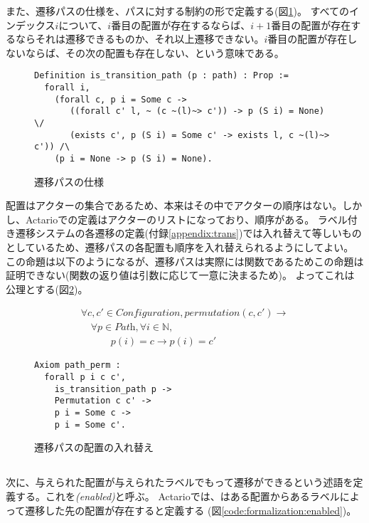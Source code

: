 また、遷移パスの仕様を、パスに対する制約の形で定義する(図\ref{code:formalization:path-spec})。
すべてのインデックス$i$について、$i$番目の配置が存在するならば、$i+1$番目の配置が存在するならそれは遷移できるものか、それ以上遷移できない。$i$番目の配置が存在しないならば、その次の配置も存在しない、という意味である。

\begin{figure}[tp]
\begin{lstlisting}
Definition is_transition_path (p : path) : Prop :=
  forall i,
    (forall c, p i = Some c ->
       ((forall c' l, ~ (c ~(l)~> c')) -> p (S i) = None) \/
       (exists c', p (S i) = Some c' -> exists l, c ~(l)~> c')) /\
    (p i = None -> p (S i) = None).
\end{lstlisting}
  \label{code:formalization:path-spec}
  \caption{遷移パスの仕様}
\end{figure}

配置はアクターの集合であるため、本来はその中でアクターの順序はない。しかし、Actarioでの定義はアクターのリストになっており、順序がある。
ラベル付き遷移システムの各遷移の定義(付録\ref{appendix:trans})では入れ替えて等しいものとしているため、遷移パスの各配置も順序を入れ替えられるようにしてよい。
この命題は以下のようになるが、遷移パスは実際には関数であるためこの命題は証明できない(関数の返り値は引数に応じて一意に決まるため)。
よってこれは公理とする(図\ref{code:proof:path-perm})。

\begin{displaymath}
  \begin{array}{l}
    \forall c, c' \in \textit{Configuration}, permutation(c, c') \rightarrow \\
    \quad \forall p \in \textit{Path}, \forall i \in \mathbb{N}, \\
    \quad \quad \quad p(i) = c \rightarrow p(i) = c'
  \end{array}
\end{displaymath}

\begin{figure}[tp]
\begin{lstlisting}
Axiom path_perm :
  forall p i c c',
    is_transition_path p ->
    Permutation c c' ->
    p i = Some c ->
    p i = Some c'.
\end{lstlisting}
  \label{code:proof:path-perm}
  \caption{遷移パスの配置の入れ替え}
\end{figure}

\subsection{\enabled}
次に、与えられた配置が与えられたラベルでもって遷移ができるという述語を定義する。これを\emph{\enabled (enabled)}と呼ぶ。
Actarioでは、\enabled はある配置からあるラベルによって遷移した先の配置が存在すると定義する (図\ref{code:formalization:enabled})。

